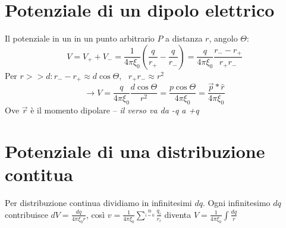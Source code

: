 \documentclass{book}
\begin{document}
\section{Potenziale di un dipolo elettrico}
Il potenziale in un in un punto arbitrario $P$ a distanza $r$, angolo $\Theta$:
\begin{equation}
  V=V_++V_- =\frac{1}{4\pi\xi_0}\left(\frac{q}{r_+} - \frac{q}{r_-}\right)=
  \frac{q}{4\pi\xi_0}\frac{r_--r_+}{r_+r_-}
\end{equation}
Per $r>>d:r_--r_+\approx d \cos\Theta,\text{ } r_+r_-\approx r^2$
\begin{equation*}
  \to V = \frac{q}{4\pi\xi_0}\frac{d\cos \Theta}{r^2}=\frac{p\cos\Theta}{4\pi\xi_0}=
  \frac{\overrightarrow{p}*\hat{r}}{4\pi\xi_0}
\end{equation*}
Ove $\overrightarrow{r}$ è il momento dipolare -- \textit{\color{blue}il verso va da -q a +q}
\section{Potenziale di una distribuzione contitua}
Per distribuzione continua dividiamo in infinitesimi $dq$. Ogni infinitesimo $dq$ contribuisce $dV=\frac{dq}{4\pi\xi_0r}$, così $v=\frac{1}{4\pi\xi_0}\sum^n\limits_{i=0}\frac{q_i}{r_i}$ diventa $V=\frac{1}{4\pi\xi_0}\int \frac{dq}{r}$
\end{document}
